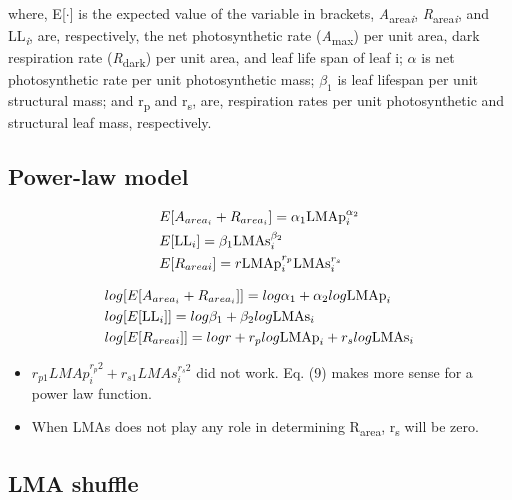 \documentclass[12pt,]{article}
\providecommand{\tightlist}{%
  \setlength{\itemsep}{0pt}\setlength{\parskip}{0pt}}
\theoremstyle{definition}
\theoremstyle{definition}
\theoremstyle{remark}
\begin{document}
where, E{[}\(\cdot\){]} is the expected value of the variable in
brackets, \emph{A}\textsubscript{area\emph{i}},
\emph{R}\textsubscript{area\emph{i}}, and LL\textsubscript{\emph{i}},
are, respectively, the net photosynthetic rate
(\emph{A}\textsubscript{max}) per unit area, dark respiration rate
(\emph{R}\textsubscript{dark}) per unit area, and leaf life span of leaf
i; \(\alpha\) is net photosynthetic rate per unit photosynthetic mass;
\(\beta_1\) is leaf lifespan per unit structural mass; and
r\textsubscript{p} and r\textsubscript{s}, are, respiration rates per
unit photosynthetic and structural leaf mass, respectively.

\subsection{Power-law model}\label{power-law-model}

\begin{align}
  &E[A_{area_i} + R_{area_i}]
  = \alpha_1{\rm LMAp}_{i}^{\alpha_2} \label{eq:E-AR2}\\
  &E[{\rm LL}_{i}] = \beta_{1} {\rm LMAs}_{i}^{\beta_2} \label{eq:E-LL2}\\
  &E[R_{areai}] = r{\rm LMAp}_{i}^{r_p}{\rm LMAs}_{i}^{r_s} \label{eq:E-R2}
\end{align}

\begin{align}
  &log[E[A_{area_i} + R_{area_i}]]
  = log\alpha_1 + {\alpha_2}log{\rm LMAp}_{i}\label{eq:E-AR3}\\
  &log[E[{\rm LL}_{i}]] =  log\beta_1 + {\beta_2}log{\rm LMAs}_{i} \label{eq:E-LL3}\\
  &log[E[R_{areai}]] =  logr + r_p log{\rm LMAp}_i + r_s log{\rm LMAs}_i \label{eq:E-R3}
\end{align}

\begin{itemize}
\tightlist
\item
  \(r_{p1} LMAp_{i}^{r_p2} + r_{s1} LMAs_{i}^{r_s2}\) did not work. Eq.
  (9) makes more sense for a power law function.
\item
  When LMAs does not play any role in determining R\textsubscript{area},
  r\textsubscript{s} will be zero.
\end{itemize}

\subsection{LMA shuffle}\label{lma-shuffle}
\end{document}
